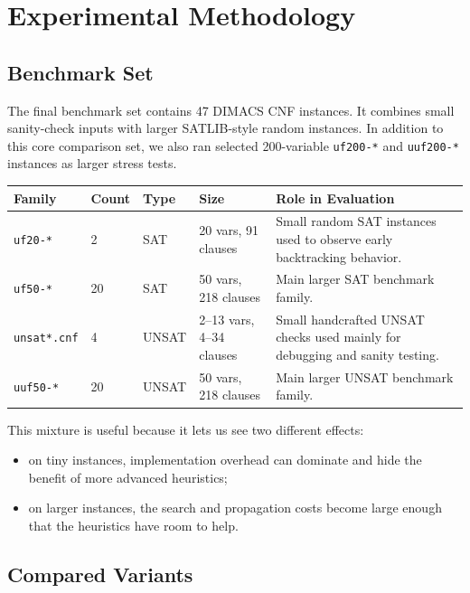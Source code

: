 \documentclass[11pt]{article}
\begin{document}
\section{Experimental Methodology}

\subsection{Benchmark Set}

The final benchmark set contains 47 DIMACS CNF instances. It combines small
sanity-check inputs with larger SATLIB-style random instances.
In addition to this core comparison set, we also ran selected 200-variable
\texttt{uf200-*} and \texttt{uuf200-*} instances as larger stress tests.

\begin{center}
\small
\renewcommand{\arraystretch}{1.08}
\begin{tabular}{|p{2.2cm}|p{0.9cm}|p{1.0cm}|p{2.2cm}|p{6.0cm}|}
\hline
\textbf{Family} & \textbf{Count} & \textbf{Type} & \textbf{Size} & \textbf{Role in Evaluation} \\
\hline
\texttt{uf20-*} & 2 & SAT & 20 vars, 91 clauses & Small random SAT instances used to observe early backtracking behavior. \\
\hline
\texttt{uf50-*} & 20 & SAT & 50 vars, 218 clauses & Main larger SAT benchmark family. \\
\hline
\texttt{unsat*.cnf} & 4 & UNSAT & 2--13 vars, 4--34 clauses & Small handcrafted UNSAT checks used mainly for debugging and sanity testing. \\
\hline
\texttt{uuf50-*} & 20 & UNSAT & 50 vars, 218 clauses & Main larger UNSAT benchmark family. \\
\hline
\end{tabular}
\end{center}

This mixture is useful because it lets us see two different effects:

\begin{itemize}
    \item on tiny instances, implementation overhead can dominate and hide the
    benefit of more advanced heuristics;
    \item on larger instances, the search and propagation costs become large
    enough that the heuristics have room to help.
\end{itemize}

\subsection{Compared Variants}
\end{document}
